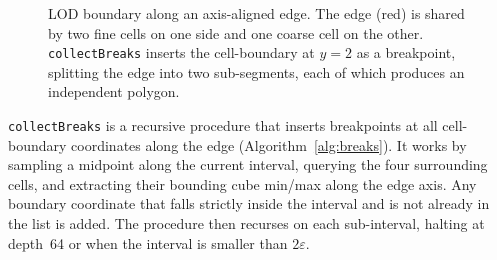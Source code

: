 \documentclass[10pt,a4paper]{article}
\begin{document}
\begin{figure}[htb]
\centering
{}
\caption{LOD boundary along an axis-aligned edge.  The edge (red) is shared
by two fine cells on one side and one coarse cell on the other.
\texttt{collectBreaks} inserts the cell-boundary at $y=2$ as a breakpoint,
splitting the edge into two sub-segments, each of which produces an
independent polygon.}
\label{fig:lod_boundary}
\end{figure}

\lstinline{collectBreaks} is a recursive procedure that inserts
breakpoints at all cell-boundary coordinates along the edge
(Algorithm~\ref{alg:breaks}).  It works by sampling a midpoint along the
current interval, querying the four surrounding cells, and extracting
their bounding cube min/max along the edge axis.  Any boundary coordinate
that falls strictly inside the interval and is not already in the list is
added.  The procedure then recurses on each sub-interval, halting at
depth~64 or when the interval is smaller than $2\varepsilon$.
\end{document}
